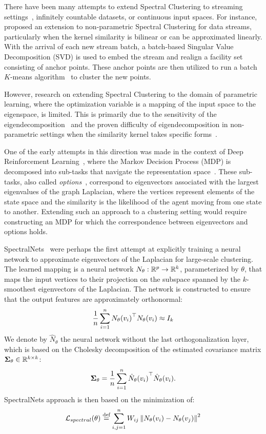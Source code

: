There have been many attempts to extend Spectral Clustering to streaming
settings~\citep{streamclustering}, infinitely countable datasets, or continuous
input spaces. For instance, \citet{streamspec} proposed an extension to
non-parametric Spectral Clustering for data streams, particularly when the kernel
similarity is bilinear or can be approximated linearly. With the arrival of each
new stream batch, a batch-based Singular Value Decomposition (SVD) is used to embed
the stream and realign a facility set consisting of anchor points. These anchor
points are then utilized to run a batch $K$-means algorithm~\citep{fastkmeans} to
cluster the new points.

However, research on extending Spectral Clustering to the domain of parametric
learning, where the optimization variable is a mapping of the input space to the
eigenspace, is limited. This is primarily due to the sensitivity of the
eigendecomposition~\citep{sensitiveigen} and the proven difficulty of
eigendecomposition in non-parametric settings when the similarity kernel takes
specific forms~\citep{sparsenystrom}.

One of the early attempts in this direction was made in the context of Deep
Reinforcement Learning~\citep{deeprloptions}, where the Markov Decision Process
(MDP) is decomposed into sub-tasks that navigate the representation
space~\citep{eigenoption}. These sub-tasks, also called
\textit{options}~\citep{optiondiscover}, correspond to eigenvectors associated with
the largest eigenvalues of the graph Laplacian, where the vertices represent
elements of the state space and the similarity is the likelihood of the agent
moving from one state to another. Extending such an approach to a clustering
setting would require constructing an MDP for which the correspondence between
eigenvectors and options holds.

SpectralNets~\citep{spectralnet} were perhaps the first attempt at explicitly
training a neural network to approximate eigenvectors of the Laplacian for
large-scale clustering. The learned mapping is a neural network $N_\theta : \mathbb{R}^p
\rightarrow \mathbb{R}^k$, parameterized by $\theta$, that maps the input vertices to their
projection on the subspace spanned by the $k$-smoothest eigenvectors of the
Laplacian. The network is constructed to ensure that the output features are
approximately orthonormal:
\[
	{\frac{1}{n}}\sum_{i=1}^{n} {N_\theta(v_i)}^\top {N_\theta(v_i)} \approx I_k
\]
We denote by $\hat{N}_\theta$ the neural network without the last
  orthogonalization layer, which is based on the Cholesky decomposition of the
  estimated covariance matrix ${\bm{\Sigma}}_\theta \in \mathbb{R}^{k \times k}$:
\[
	{\bm{\Sigma}}_\theta = {\frac{1}{n}}\sum_{i=1}^{n} {\hat{N}_\theta(v_i)}^\top {\hat{N}_\theta(v_i)}.
\]
SpectralNets approach is then based on the minimization of:
\begin{align}
	\label{eq:spectralneloss}
	{\mathcal{L}}_{spectral}(\theta)\stackrel{\text{def}}{=}
	\sum_{i,j=1}^{n} {W}_{ij} \left\lVert N_\theta(v_i) -{N_\theta(v_j)}\right\rVert^2
\end{align}

